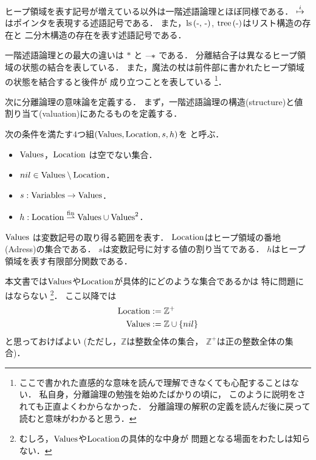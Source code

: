 \documentclass[a4paper, 10pt]{ltjsarticle}
\begin{document}
  ヒープ領域を表す記号が増えている以外は一階述語論理とほぼ同様である．
  $\mathrel{\overset{i}{\mapsto}}$ はポインタを表現する述語記号である．
  また，$\mathprls{\mathdash}{\mathdash}$, $\mathprtree{\mathdash}$はリスト構造の存在と
  二分木構造の存在を表す述語記号である．

  一階述語論理との最大の違いは $*$ と
  $\mathrel{\text{---}\!\!*}$ である．
  分離結合子は異なるヒープ領域の状態の結合を表している．
  また，魔法の杖は前件部に書かれたヒープ領域の状態を結合すると後件が
  成り立つことを表している
  \footnote{ここで書かれた直感的な意味を読んで理解できなくても心配することはない．
  私自身，分離論理の勉強を始めたばかりの頃に，
  このように説明をされても正直よくわからなかった．
  分離論理の解釈の定義を読んだ後に戻って読むと意味がわかると思う．}．

  次に分離論理の意味論を定義する．
  まず，一階述語論理の構造(structure)と値割り当て(valuation)にあたるものを定義する．

 \begin{definition} 
  次の条件を満たす4つ組$\left(\mathrm{Values}, \mathrm{Location}, s, h \right)$を
  と呼ぶ．
  \begin{itemize}
   \item $\mathrm{Values}$，$\mathrm{Location}$ は空でない集合．
   \item $ nil \in \mathrm{Values} \setminus \mathrm{Location}$．
   \item $s:\mathrm{Variables} \to \mathrm{Values} $．
   \item $h:\mathrm{Location} \mathrel{\overset{\mathrm{fin}}{\rightharpoonup}} \mathrm{Values} \cup \mathrm{Values}^2$．
  \end{itemize}
 \end{definition} 
 
 $\mathrm{Values}$ は変数記号の取り得る範囲を表す．
 $\mathrm{Location}$はヒープ領域の番地(Adress)の集合である．
 $s$は変数記号に対する値の割り当てである．
 $h$はヒープ領域を表す有限部分関数である．

 本文書では$\mathrm{Values}$や$\mathrm{Location}$が具体的にどのような集合であるかは
 特に問題にはならない
 \footnote{むしろ，$\mathrm{Values}$や$\mathrm{Location}$の具体的な中身が
 問題となる場面をわたしは知らない．}．
 ここ以降では
 \begin{align*}
  \mathrm{Location} &:= \mathbb{Z}^{+} \\
  \mathrm{Values} &:= \mathbb{Z} \cup \left\{ nil \right\}
 \end{align*} 
 と思っておけばよい
 (ただし，$\mathbb{Z}$は整数全体の集合，
 $\mathbb{Z}^{+}$は正の整数全体の集合)．
\end{document}
